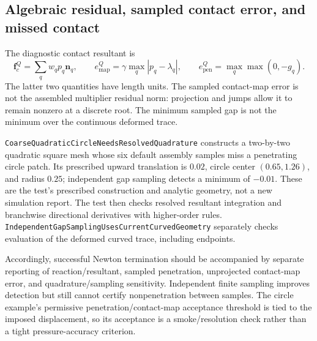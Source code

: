 \documentclass[preprint,11pt]{elsarticle}
\numberwithin{equation}{section}
\newcommand{\bn}{\boldsymbol{n}}
\newcommand{\code}[1]{\texttt{\nolinkurl{#1}}}
\begin{document}
\subsection{Algebraic residual, sampled contact error, and missed contact}
The diagnostic contact resultant is
\begin{equation}
 \boldsymbol f_c^Q=\sum_qw_qp_q\bn_q,
 \qquad e_{\mathrm{map}}^Q=\gamma\max_q|p_q-\lambda_q|,
 \qquad e_{\mathrm{pen}}^Q=\max_q\max(0,-g_q).
 \label{eq:diagnostics}
\end{equation}
The latter two quantities have length units. The sampled contact-map
error is not the assembled multiplier residual norm: projection and jumps
allow it to remain nonzero at a discrete root. The minimum sampled gap
is not the minimum over the continuous deformed trace.

\code{CoarseQuadraticCircleNeedsResolvedQuadrature} constructs a
two-by-two quadratic square mesh whose six default assembly samples
miss a penetrating circle patch. Its prescribed upward translation is
$0.02$, circle center $(0.65,1.26)$, and radius $0.25$; independent gap
sampling detects a minimum of $-0.01$. These are the test's prescribed
construction and analytic geometry, not a new simulation report. The
test then checks resolved resultant integration and branchwise
directional derivatives with higher-order rules.
\code{IndependentGapSamplingUsesCurrentCurvedGeometry} separately
checks evaluation of the deformed curved trace, including endpoints.

Accordingly, successful Newton termination should be accompanied by
separate reporting of reaction/resultant, sampled penetration,
unprojected contact-map error, and quadrature/sampling sensitivity.
Independent finite sampling improves detection but still cannot certify
nonpenetration between samples. The circle example's permissive
penetration/contact-map acceptance threshold is tied to the imposed
displacement, so its acceptance is a smoke/resolution check rather than
a tight pressure-accuracy criterion.
\end{document}
